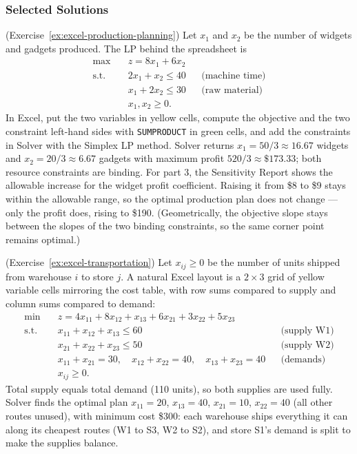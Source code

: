 \subsubsection*{Selected Solutions}

\begin{solution}(Exercise~\ref{ex:excel-production-planning})
Let $x_1$ and $x_2$ be the number of widgets and gadgets produced.  The LP behind the spreadsheet is
\begin{align*}
\max \quad & z = 8x_1 + 6x_2\\
\text{s.t.} \quad & 2x_1 + x_2 \leq 40 && \text{(machine time)}\\
& x_1 + 2x_2 \leq 30 && \text{(raw material)}\\
& x_1, x_2 \geq 0.
\end{align*}
In Excel, put the two variables in yellow cells, compute the objective and the two constraint left-hand sides with \texttt{SUMPRODUCT} in green cells, and add the constraints in Solver with the Simplex LP method.  Solver returns $x_1 = 50/3 \approx 16.67$ widgets and $x_2 = 20/3 \approx 6.67$ gadgets with maximum profit $520/3 \approx \$173.33$; both resource constraints are binding.
For part 3, the Sensitivity Report shows the allowable increase for the widget profit coefficient.  Raising it from \$8 to \$9 stays within the allowable range, so the optimal production plan does not change --- only the profit does, rising to \$190.  (Geometrically, the objective slope stays between the slopes of the two binding constraints, so the same corner point remains optimal.)
\end{solution}

\begin{solution}(Exercise~\ref{ex:excel-transportation})
Let $x_{ij} \geq 0$ be the number of units shipped from warehouse $i$ to store $j$.  A natural Excel layout is a $2 \times 3$ grid of yellow variable cells mirroring the cost table, with row sums compared to supply and column sums compared to demand:
\begin{align*}
\min \quad & z = 4x_{11} + 8x_{12} + x_{13} + 6x_{21} + 3x_{22} + 5x_{23}\\
\text{s.t.} \quad & x_{11} + x_{12} + x_{13} \leq 60 && \text{(supply W1)}\\
& x_{21} + x_{22} + x_{23} \leq 50 && \text{(supply W2)}\\
& x_{11} + x_{21} = 30, \quad x_{12} + x_{22} = 40, \quad x_{13} + x_{23} = 40 && \text{(demands)}\\
& x_{ij} \geq 0.
\end{align*}
Total supply equals total demand (110 units), so both supplies are used fully.  Solver finds the optimal plan $x_{11} = 20$, $x_{13} = 40$, $x_{21} = 10$, $x_{22} = 40$ (all other routes unused), with minimum cost \$300: each warehouse ships everything it can along its cheapest routes (W1 to S3, W2 to S2), and store S1's demand is split to make the supplies balance.
\end{solution}

